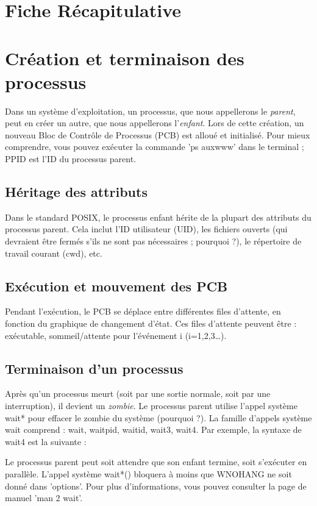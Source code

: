 \documentclass[12pt]{report}
\begin{document}
\section*{Fiche Récapitulative}
\section{Création et terminaison des processus}

Dans un système d'exploitation, un processus, que nous appellerons le \textit{parent}, peut en créer un autre, que nous appellerons l'\textit{enfant}. Lors de cette création, un nouveau Bloc de Contrôle de Processus (PCB) est alloué et initialisé. Pour mieux comprendre, vous pouvez exécuter la commande 'ps auxwww' dans le terminal ; PPID est l'ID du processus parent.

\subsection{Héritage des attributs}

Dans le standard POSIX, le processus enfant hérite de la plupart des attributs du processus parent. Cela inclut l'ID utilisateur (UID), les fichiers ouverts (qui devraient être fermés s'ils ne sont pas nécessaires ; pourquoi ?), le répertoire de travail courant (cwd), etc.

\subsection{Exécution et mouvement des PCB}

Pendant l'exécution, le PCB se déplace entre différentes files d'attente, en fonction du graphique de changement d'état. Ces files d'attente peuvent être : exécutable, sommeil/attente pour l'événement i (i=1,2,3…).

\subsection{Terminaison d'un processus}

Après qu'un processus meurt (soit par une sortie normale, soit par une interruption), il devient un \textit{zombie}. Le processus parent utilise l'appel système wait* pour effacer le zombie du système (pourquoi ?). La famille d'appels système wait comprend : wait, waitpid, waitid, wait3, wait4. Par exemple, la syntaxe de wait4 est la suivante :

Le processus parent peut soit attendre que son enfant termine, soit s'exécuter en parallèle. L'appel système wait*() bloquera à moins que WNOHANG ne soit donné dans 'options'. Pour plus d'informations, vous pouvez consulter la page de manuel 'man 2 wait'.
\end{document}
